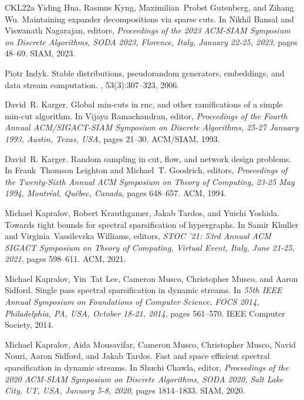 \documentclass[epsfig,letter,11pt]{article}
\numberwithin{equation}{section}
\begin{document}
\begin{thebibliography}{CKL{\etalchar{+}}22a}
Yiding Hua, Rasmus Kyng, Maximilian~Probst Gutenberg, and Zihang Wu.
\newblock Maintaining expander decompositions via sparse cuts.
\newblock In Nikhil Bansal and Viswanath Nagarajan, editors, {\em Proceedings
  of the 2023 {ACM-SIAM} Symposium on Discrete Algorithms, {SODA} 2023,
  Florence, Italy, January 22-25, 2023}, pages 48--69. {SIAM}, 2023.

Piotr Indyk.
\newblock Stable distributions, pseudorandom generators, embeddings, and data
  stream computation.
, 53(3):307--323, 2006.

David~R. Karger.
\newblock Global min-cuts in rnc, and other ramifications of a simple min-cut
  algorithm.
\newblock In Vijaya Ramachandran, editor, {\em Proceedings of the Fourth Annual
  {ACM/SIGACT-SIAM} Symposium on Discrete Algorithms, 25-27 January 1993,
  Austin, Texas, {USA}}, pages 21--30. {ACM/SIAM}, 1993.

David~R. Karger.
\newblock Random sampling in cut, flow, and network design problems.
\newblock In Frank~Thomson Leighton and Michael~T. Goodrich, editors, {\em
  Proceedings of the Twenty-Sixth Annual {ACM} Symposium on Theory of
  Computing, 23-25 May 1994, Montr{\'{e}}al, Qu{\'{e}}bec, Canada}, pages
  648--657. {ACM}, 1994.

Michael Kapralov, Robert Krauthgamer, Jakab Tardos, and Yuichi Yoshida.
\newblock Towards tight bounds for spectral sparsification of hypergraphs.
\newblock In Samir Khuller and Virginia~Vassilevska Williams, editors, {\em
  {STOC} '21: 53rd Annual {ACM} {SIGACT} Symposium on Theory of Computing,
  Virtual Event, Italy, June 21-25, 2021}, pages 598--611. {ACM}, 2021.

Michael Kapralov, Yin~Tat Lee, Cameron Musco, Christopher Musco, and Aaron
  Sidford.
\newblock Single pass spectral sparsification in dynamic streams.
\newblock In {\em 55th {IEEE} Annual Symposium on Foundations of Computer
  Science, {FOCS} 2014, Philadelphia, PA, USA, October 18-21, 2014}, pages
  561--570. {IEEE} Computer Society, 2014.

Michael Kapralov, Aida Mousavifar, Cameron Musco, Christopher Musco, Navid
  Nouri, Aaron Sidford, and Jakab Tardos.
\newblock Fast and space efficient spectral sparsification in dynamic streams.
\newblock In Shuchi Chawla, editor, {\em Proceedings of the 2020 {ACM-SIAM}
  Symposium on Discrete Algorithms, {SODA} 2020, Salt Lake City, UT, USA,
  January 5-8, 2020}, pages 1814--1833. {SIAM}, 2020.


\end{thebibliography}
\end{document}
